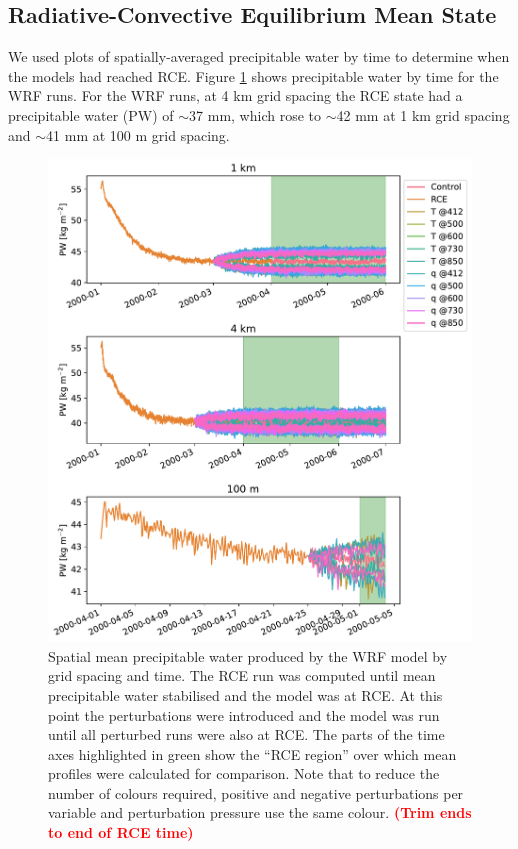 \documentclass[draft]{agujournal2019}
\newcommand{\todo}[1]{\textcolor{red}{\textbf{(#1)}}}
\begin{document}
\subsection{Radiative-Convective Equilibrium Mean State}

We used plots of spatially-averaged precipitable water by time to determine when
the models had reached RCE. Figure \ref{fig:rce_pw} shows precipitable
water by time for the WRF runs. For the WRF runs, at 4 km grid spacing the RCE state
had a precipitable water (PW) of $\sim$37 mm, which rose to $\sim$42 mm at 1 km
grid spacing and $\sim$41 mm at 100 m grid spacing.

\begin{figure}[pth]
    \noindent\includegraphics[width=\textwidth]{figures/RCE_PW_WRF} 
    \caption{Spatial mean precipitable water produced by the WRF model by grid
    spacing and time. The RCE run was computed until mean precipitable water
    stabilised and the model was at RCE. At this point the perturbations were
    introduced and the model was run until all perturbed runs were also at RCE.
    The parts of the time axes highlighted in green show the ``RCE region'' over
    which mean profiles were calculated for comparison. Note that to reduce the
    number of colours required, positive and negative perturbations per variable
    and perturbation pressure use the same colour. \todo{Trim ends to end of RCE
    time}}
    \label{fig:rce_pw}
\end{figure}
\end{document}
